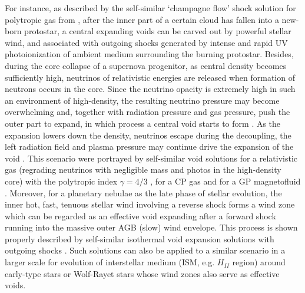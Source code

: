 \documentclass[fleqn,usenatbib]{mnras}
\begin{document}
For instance, as described by the self-similar `champagne flow' shock solution for polytropic gas from \citet{hu2008self}, after the inner part of a certain cloud has fallen into a new-born protostar, a central expanding voids can be carved out by powerful stellar wind, and associated with outgoing shocks generated by intense and rapid UV photoionization of ambient medium surrounding the burning protostar. Besides, during the core collapse of a supernova progenitor, as central density becomes sufficiently high, neutrinos of relativistic energies are released when formation of neutrons occurs in the core. Since the neutrino opacity is extremely high in such an environment of high-density, the resulting neutrino pressure may become overwhelming and, together with radiation pressure and gas pressure, push the outer part to expand, in which process a central void starts to form \citep{lou2008self}. As the expansion lowers down the density, neutrinos escape during the decoupling, the left radiation field and plasma pressure may continue drive the expansion of the void \citep{lou2012dynamic}. This scenario were portrayed by self-similar void solutions for a relativistic gas (regrading neutrinos with negligible mass and photos in the high-density core) with the polytropic index $\gamma=4/3$ \citep{lou2008self}, for a CP gas \citep{lou2012dynamic} and for a GP magnetofluid \citep{lou2010general}. Moreover, for a planetary nebulae as the late phase of stellar evolution, the inner hot, fast, tenuous stellar wind involving a reverse shock forms a wind zone which can be regarded as an effective void expanding after a forward shock running into the massive outer AGB (slow) wind envelope. This process is shown properly described by self-similar isothermal void expansion solutions with outgoing shocks \citep{lou2009dynamic}. Such solutions can also be applied to a similar scenario in a larger scale for evolution of interstellar medium (ISM, e.g. $H_{II}$ region) around early-type stars or Wolf-Rayet stars whose wind zones also serve as effective voids.
\end{document}
